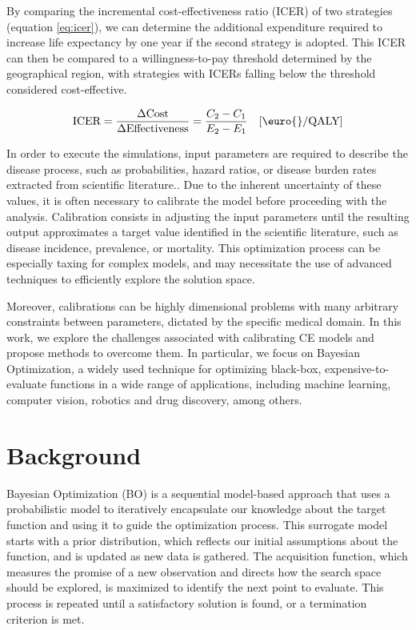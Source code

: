 \documentclass{IOS-Book-Article}
\begin{document}
	By comparing the incremental cost-effectiveness ratio (ICER) of two strategies (equation \ref{eq:icer}), we can determine the additional expenditure required to increase life expectancy by one year if the second strategy is adopted. This ICER can then be compared to a willingness-to-pay threshold determined by the geographical region, with strategies with ICERs falling below the threshold considered cost-effective.
	
	\begin{equation}
		\label{eq:icer}
		\textnormal{ICER}=\frac{\Delta \textrm{Cost}}{\Delta \textrm{Effectiveness}} = \frac{C_2-C_1}{E_2-E_1} \quad [\euro{}/\textrm{QALY}]
	\end{equation}
	
	In order to execute the simulations, input parameters are required to describe the disease process, such as probabilities, hazard ratios, or disease burden rates extracted from scientific literature.. Due to the inherent uncertainty of these values, it is often necessary to calibrate the model before proceeding with the analysis. Calibration consists in adjusting the input parameters until the resulting output approximates a target value identified in the scientific literature, such as disease incidence, prevalence, or mortality. This optimization process can be especially taxing for complex models, and may necessitate the use of advanced techniques to efficiently explore the solution space.
	
	Moreover, calibrations can be highly dimensional problems with many arbitrary constraints between parameters, dictated by the specific medical domain. In this work, we explore the challenges associated with calibrating CE models and propose methods to overcome them. In particular, we focus on Bayesian Optimization, a widely used technique for optimizing black-box, expensive-to-evaluate functions\cite{bayesian-opt} in a wide range of applications, including machine learning, computer vision, robotics and drug discovery, among others.
	
	\section{Background}	
	 Bayesian Optimization (BO) is a sequential model-based approach that uses a probabilistic model to iteratively encapsulate our knowledge about the target function and using it to guide the optimization process. This surrogate model starts with a prior distribution, which reflects our initial assumptions about the function, and is updated as new data is gathered. The acquisition function, which measures the promise of a new observation and directs how the search space should be explored, is maximized to identify the next point to evaluate. This process is repeated until a satisfactory solution is found, or a termination criterion is met.
	
\end{document}
